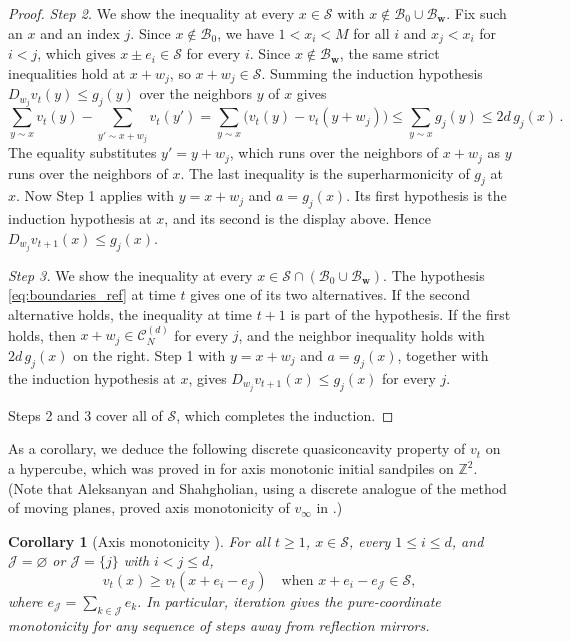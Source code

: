 \documentclass[12pt]{amsart}
\newtheorem{corollary}{Corollary}[section]
\newcommand{\Z}{\mathbb{Z}}
\begin{document}
\begin{proof}
	\emph{Step 2.} We show the inequality at every $x\in\mathcal S$ with $x\notin\mathcal B_0\cup\mathcal B_{\mathbf w}$. Fix such an $x$ and an index $j$. Since $x\notin\mathcal B_0$, we have $1<x_i<M$ for all $i$ and $x_j<x_i$ for $i<j$, which gives $x\pm e_i\in\mathcal S$ for every $i$. Since $x\notin\mathcal B_{\mathbf w}$, the same strict inequalities hold at $x+w_j$, so $x+w_j\in\mathcal S$. Summing the induction hypothesis $D_{w_j}v_t(y)\leq g_j(y)$ over the neighbors $y$ of $x$ gives
	\begin{equation*}
	\sum_{y\sim x}v_t(y)-\sum_{y'\sim x+w_j}v_t(y')=\sum_{y\sim x}\big(v_t(y)-v_t(y+w_j)\big)\leq\sum_{y\sim x}g_j(y)\leq 2d\,g_j(x)\,.
	\end{equation*}
	The equality substitutes $y'=y+w_j$, which runs over the neighbors of $x+w_j$ as $y$ runs over the neighbors of $x$. The last inequality is the superharmonicity of $g_j$ at $x$. Now Step 1 applies with $y=x+w_j$ and $a=g_j(x)$. Its first hypothesis is the induction hypothesis at $x$, and its second is the display above. Hence $D_{w_j}v_{t+1}(x)\leq g_j(x)$.
	
	\emph{Step 3.} We show the inequality at every $x\in\mathcal S\cap(\mathcal B_0\cup\mathcal B_{\mathbf w})$. The hypothesis \eqref{eq:boundaries_ref} at time $t$ gives one of its two alternatives. If the second alternative holds, the inequality at time $t+1$ is part of the hypothesis. If the first holds, then $x+w_j\in\mathcal C_N^{(d)}$ for every $j$, and the neighbor inequality holds with $2d\,g_j(x)$ on the right. Step 1 with $y=x+w_j$ and $a=g_j(x)$, together with the induction hypothesis at $x$, gives $D_{w_j}v_{t+1}(x)\leq g_j(x)$ for every $j$.
	
	Steps 2 and 3 cover all of $\mathcal S$, which completes the induction.
	\end{proof}
	
	\noindent As a corollary, we deduce the following discrete quasiconcavity property of $v_t$ on a hypercube, which was proved in \cite{babai2007sandpile}
	for axis monotonic initial sandpiles on $\Z^2$.  (Note that Aleksanyan and Shahgholian, using a discrete analogue of the method of moving planes, proved axis monotonicity
	of $v_{\infty}$ in \cite{aleksanyan2019discrete}.)
	\begin{corollary}[Axis monotonicity \cite{babai2007sandpile}] \label{axis_monotonicity}
		For all $t\geq1$, $x\in\mathcal S$, every $1\leq i\leq d$, and
        $\mathcal J=\varnothing$ or $\mathcal J=\{j\}$ with $i<j\leq d$,
        \[
        v_t(x)\geq v_t(x+e_i-e_{\mathcal J})
        \quad\mbox{when $x+e_i-e_{\mathcal J}\in\mathcal S$},
        \]
        where $e_{\mathcal J}=\sum_{k\in\mathcal J}e_k$.
        In particular, iteration gives the pure-coordinate monotonicity
        for any sequence of steps away from reflection mirrors.
	\end{corollary}
\end{document}
